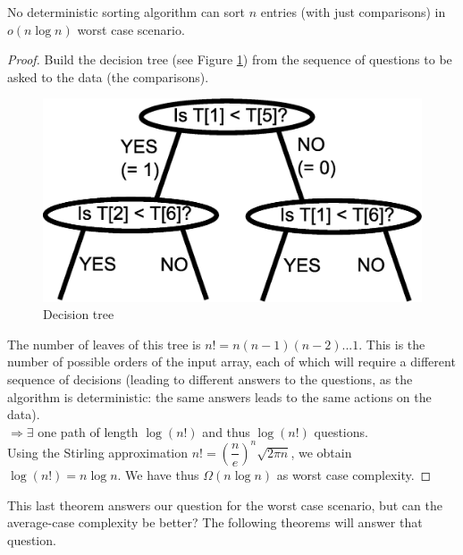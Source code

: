 \begin{theorem}
No deterministic sorting algorithm can sort $n$ entries (with just comparisons) in $o(n\log n)$ worst case scenario.
\end{theorem}
\begin{proof}
Build the decision tree (see Figure \ref{tree7}) from the sequence of questions to be asked to the data (the comparisons).
\begin{figure}[htbp]
\centering
\includegraphics[scale=0.5]{images/CM2/tree7.eps}
\caption{Decision tree}
\label{tree7}
\end{figure}
The number of leaves of this tree is $n! = n(n-1)(n-2)...1$. This is the number of possible orders of the input array, each of which will require a different sequence of decisions (leading to different answers to the questions, as the algorithm is deterministic: the same answers leads to the same actions on the data). \\

$\Rightarrow \exists$ one path of length $\log (n!)$ and thus $\log(n!)$ questions. \\

Using the Stirling approximation $n! = \left( \dfrac{n}{e} \right)^n \sqrt{2\pi n}$, we obtain $\log (n!) = n \log n$. We have thus $\Omega (n \log n)$ as worst case complexity.

\end{proof}

This last theorem answers our question for the worst case scenario, but can the average-case complexity be better? The following theorems will answer that question.\\


